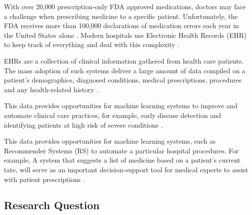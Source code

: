 With over 20,000 prescription-only FDA approved medications,
doctors may face a challenge when prescribing medicine to a
specific patient. Unfortunately, the FDA receives more than
100,000 declarations of medication errors each year in the United
States alone \cite{FDA2021}. Modern hospitals use Electronic
Health Records (EHR) to keep track of everything and deal with
this complexity \cite{Kim2019}. 

EHRs are a collection of clinical information gathered
from health care patients. The mass adoption of such
systems deliver a large amount of data compiled on a
patient's demographics, diagnosed conditions, medical
prescriptions, procedures and any health-related history
\cite{Kim2019}.


This data provides opportunities for machine learning systems to improve and
automate clinical care practices, for example, early disease detection and
identifying patients at high risk of severe conditions
\cite{10.2307/20720782, Juhn2019}.

This data provides opportunities for machine learning systems,
such as Recommender Systems (RS) to automate a particular
hospital procedures. For example, A system that suggests a list
of medicine based on a patient's current tate, will serve as an
important decision-support tool for medical experts to assist
with patient prescriptions \cite{Bhoi2021}.

\subsection{Research Question}
